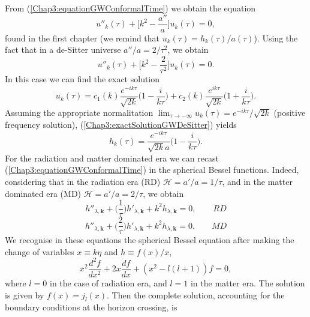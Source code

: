 \documentclass[11pt,a4paper,twoside]{book}
\begin{document}
From (\ref{Chap3:equationGWConformalTime}) we obtain the equation 
\begin{equation}
	\label{Chap3:eomMasslessDesitter}
	u''_{k}(\tau) + \Big[k^{2} - \frac{a''}{a}\Big]u_{k}(\tau) = 0,
\end{equation}
found in the first chapter (we remind that $ u_{k}(\tau) = h_{k}(\tau)/a(\tau) $). Using the fact that in a de-Sitter universe $ a''/a = 2/\tau^{2}  $, we obtain
\begin{equation}
	\label{eomMasslessDesitter2}
	u''_{k}(\tau) + \Big[k^{2} - \frac{2}{\tau^{2}}\Big]u_{k}(\tau) = 0.
\end{equation}
In this case we can find the exact solution 
\begin{equation}
	\label{Chap3:exactSolutionGWDeSitter}
	u_{k}(\tau) = c_{1}(k) \frac{e^{-ik\tau}}{\sqrt{2k}}\Big (1-\frac{i}{k\tau}\Big) + c_{2}(k) \frac{e^{ik\tau}}{\sqrt{2k}}\Big (1+\frac{i}{k\tau}\Big).
\end{equation}
Assuming the appropriate normalitation $ \lim_{\tau \rightarrow -\infty} u_{k}(\tau) = e^{-ik\tau}/\sqrt{2k}$ (positive frequency solution), (\ref{Chap3:exactSolutionGWDeSitter}) yields
\begin{equation}
	\label{Chap3:solutionBunchDavis}
h_{k}(\tau)= \frac{e^{-ik\tau}}{\sqrt{2k}a}\Big (1-\frac{i}{k\tau}\Big).
\end{equation}
For the radiation and matter dominated era we can recast (\ref{Chap3:equationGWConformalTime}) in the spherical Bessel functions. Indeed, considering that in the radiation era (RD) $\mathcal{H}= a'/a = 1/\tau$, and in the matter dominated era (MD) $\mathcal{H}=a'/a=2/\tau$, we obtain
\begin{equation}
	\label{Chap3:RadiationEra}
		h''_{\lambda,\textbf{k}} + \Big (\frac{1}{\tau}\Big)h'_{\lambda,\textbf{k}} + k^{2}h_{\lambda,\textbf{k}} = 0,
		\qquad
		RD
\end{equation}
\begin{equation}
	\label{Chap3:MatterEra}
	h''_{\lambda,\textbf{k}} + \Big (\frac{2}{\tau}\Big)h'_{\lambda,\textbf{k}} + k^{2}h_{\lambda,\textbf{k}} = 0.
	\qquad
	MD
\end{equation}
 We recognise in these equations the spherical Bessel equation after making the change of variables $ x\equiv k\eta $ and $ h\equiv f(x)/x $,
\begin{equation}
	\label{BesselFunction}
	x^{2}\frac{d^{2}f}{dx^{2}} + 2x\frac{df}{dx} + (x^{2} - l(l+1))f = 0,
\end{equation}
where $ l=0 $ in the case of radiation era, and $ l=1 $ in the matter era. The solution is given by $ f(x) = j_{l}(x) $.  Then the complete solution, accounting for the boundary conditions at the horizon crossing, is
\end{document}
